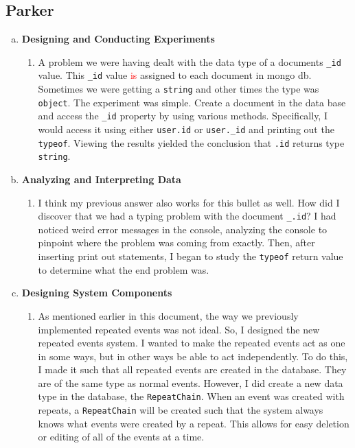 \documentclass[11pt]{article}   %
\newcommand{\dcomment}[1]{\textcolor{red}{#1}}
\begin{document}
\subsection*{Parker}

\begin{enumerate} [a)]
\item  {\bf Designing and Conducting Experiments}
\begin{enumerate} [$\cdot$]
\item A problem we were having dealt with the data type of a documents \texttt{\_id} value. This \texttt{\_id} value \dcomment{is } assigned to each document in mongo db. Sometimes we were getting a \texttt{string} and other times the type was \texttt{object}. The experiment was simple. Create a document in the data base and access the \texttt{\_id} property by using various methods. Specifically, I would access it using either \texttt{user.id} or \texttt{user.\_id} and printing out the \texttt{typeof}. Viewing the results yielded the conclusion that \texttt{.id} returns type \texttt{string}.
\end{enumerate}
\item  {\bf Analyzing and Interpreting Data}
\begin{enumerate} [$\cdot$]
\item I think my previous answer also works for this bullet as well. How did I discover that we had a typing problem with the document \texttt{\_.id}? I had noticed weird error messages in the console, analyzing the console to pinpoint where the problem was coming from exactly. Then, after inserting print out statements, I began to study the \texttt{typeof} return value to determine what the end problem was. 
\end{enumerate}
\item {\bf Designing System Components}
\begin{enumerate} [$\cdot$]
\item As mentioned earlier in this document, the way we previously implemented repeated events was not ideal. So, I designed the new repeated events system. I wanted to make the repeated events act as one in some ways, but in other ways be able to act independently. To do this, I made it such that all repeated events are created in the database. They are of the same type as normal events. However, I did create a new data type in the database, the \texttt{RepeatChain}. When an event was created with repeats, a \texttt{RepeatChain} will be created such that the system always knows what events were created by a repeat. This allows for easy deletion or editing of all of the events at a time.

\end{enumerate}
\end{enumerate}
\end{document}
